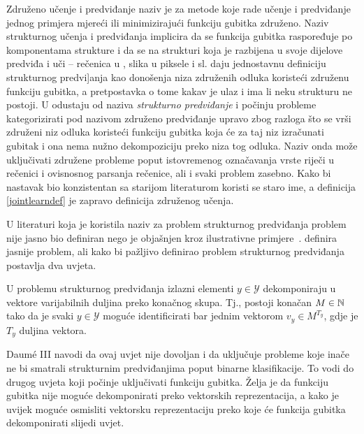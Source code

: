 Združeno učenje i predviđanje  naziv je za
metode koje rade učenje i predviđanje jednog primjera mjereći ili minimizirajući
funkciju gubitka združeno. Naziv strukturnog učenja i predviđanja
 implicira da se funkcija gubitka
raspoređuje po komponentama strukture i da se na strukturi koja je razbijena u
svoje dijelove predviđa i uči -- rečenica u , slika u piksele
i sl. \citet{daume14lts} daju jednostavnu definiciju strukturnog predvi]anja kao
donošenja niza združenih odluka koristeći združenu funkciju gubitka, a
pretpostavka o tome kakav je ulaz i ima li neku strukturu ne postoji. U
\citep{daume15naacltalk} odustaju od naziva \emph{strukturno predviđanje} i
počinju probleme kategorizirati pod nazivom združeno predviđanje upravo zbog
razloga što se vrši združeni niz odluka koristeći funkciju gubitka koja će za
taj niz izračunati gubitak i ona nema nužno dekompoziciju preko niza tog odluka.
Naziv onda može uključivati združene probleme poput istovremenog označavanja
vrste riječi u rečenici i ovisnosnog parsanja rečenice, ali i svaki problem
zasebno. Kako bi nastavak bio konzistentan sa starijom literaturom koristi se
staro ime, a definicija \ref{jointlearndef} je zapravo definicija združenog
učenja.

U literaturi koja je koristila naziv za problem strukturnog predviđanja problem
nije jasno bio definiran nego je objašnjen kroz ilustrativne
primjere~\citep{mccallum2000maximum, punyakanok2001use, lafferty2001conditional,
collins2002discriminative, taskar2003maximum, mcallester2004case,
tsochantaridis2005large}. \citet{daume06thesis} definira jasnije problem, ali
kako bi pažljivo definirao problem strukturnog predviđanja postavlja dva uvjeta.

\begin{condition} \label{uvjet1}

  U problemu strukturnog predviđanja izlazni elementi $y \in \mathcal{Y}$
  dekomponiraju u vektore varijabilnih duljina preko konačnog skupa. Tj.,
  postoji konačan $M \in \mathbb{N}$ tako da je svaki $y \in \mathcal{Y}$ moguće
  identificirati bar jednim vektorom $v_y \in M^{T_y}$, gdje je $T_y$ duljina
  vektora.

\end{condition}

Daum\'e III navodi da ovaj uvjet nije dovoljan i da uključuje probleme koje
inače ne bi smatrali strukturnim predviđanjima poput binarne klasifikacije. To
vodi do drugog uvjeta koji počinje uključivati funkciju gubitka. Želja je da
funkciju gubitka nije moguće dekomponirati preko vektorskih reprezentacija, a
kako je uvijek moguće osmisliti vektorsku reprezentaciju preko koje će funkcija
gubitka dekomponirati slijedi uvjet.

